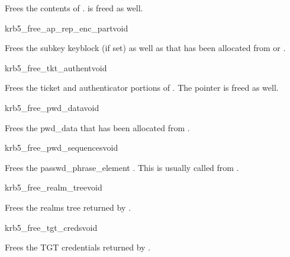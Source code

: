 Frees the contents of .  is freed as
well.

\begin{funcdecl}{krb5_free_ap_rep_enc_part}{void}{\funcinout}
\end{funcdecl}

Frees the subkey keyblock (if set) as well as  that has
been allocated from  or .

\begin{funcdecl}{krb5_free_tkt_authent}{void}{\funcinout}
\end{funcdecl}

Frees the ticket and authenticator portions of . The
pointer  is freed as well.

\begin{funcdecl}{krb5_free_pwd_data}{void}{\funcinout}
\end{funcdecl}

Frees the pwd_data  that has been allocated from
. 

\begin{funcdecl}{krb5_free_pwd_sequences}{void}{\funcinout}
\end{funcdecl}

Frees the passwd_phrase_element . This is usually called
from .

\begin{funcdecl}{krb5_free_realm_tree}{void}{\funcinout}
\end{funcdecl}

Frees the realms tree  returned by
.

\begin{funcdecl}{krb5_free_tgt_creds}{void}{\funcinout}
\end{funcdecl}

Frees the TGT credentials  returned by
.


